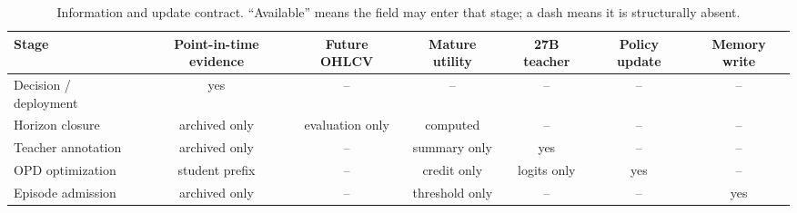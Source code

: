 \begin{table}[t]
\centering
\small
\caption{Information and update contract. ``Available'' means the field may enter that stage; a dash means it is structurally absent.}
\label{tab:protocol_audit}
\setlength{\tabcolsep}{5pt}
\begin{tabular}{lcccccc}
\toprule
Stage & Point-in-time evidence & Future OHLCV & Mature utility & 27B teacher & Policy update & Memory write \\
\midrule
Decision / deployment & yes & -- & -- & -- & -- & -- \\
Horizon closure & archived only & evaluation only & computed & -- & -- & -- \\
Teacher annotation & archived only & -- & summary only & yes & -- & -- \\
OPD optimization & student prefix & -- & credit only & logits only & yes & -- \\
Episode admission & archived only & -- & threshold only & -- & -- & yes \\
\bottomrule
\end{tabular}
\end{table}

